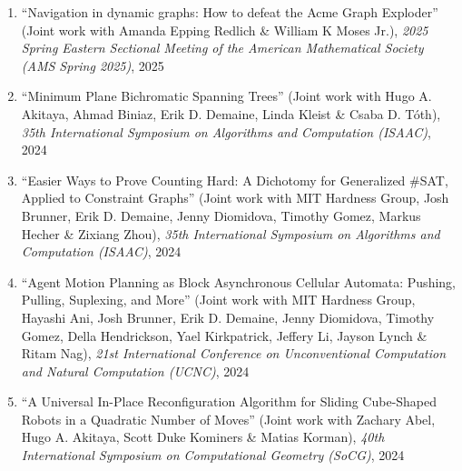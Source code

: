 \documentclass[letterpaper,11pt]{article}
\makeatletter
\newcommand{\publication}[6]{
  \item ``#1'' %
   (Joint work with#2), %
     \emph{#3}, %
      #4%


}
\newcommand{\pdficon}{\faFilePdf}
\newcommand{\doilabel}{\texttt{DOI}}
\makeatother
\begin{document}
\begin{enumerate}
        \publication
          {Navigation in dynamic graphs: How to defeat the Acme Graph Exploder}
          {
 Amanda Epping Redlich \& William K Moses Jr.}
          {2025 Spring Eastern Sectional Meeting of the American Mathematical Society (AMS Spring 2025)}
          {2025}
          {%
%
%
%
          }
          {6}
 \vspace{-.5em}  
      
        \publication
          {Minimum Plane Bichromatic Spanning Trees}
          {
 Hugo A. Akitaya, Ahmad Biniaz, Erik D. Demaine, Linda Kleist \& Csaba D. Tóth}
          {35th International Symposium on Algorithms and Computation (ISAAC)}
          {2024}
          {%
\href{tba/docstore/MPBST-ISAAC.pdf}{\pdficon}%
%
\quad\href{https://doi.org/10.4230/LIPIcs.ISAAC.2024.4}{\doilabel}%
          }
          {7}
 \vspace{-.5em}  
      
        \publication
          {Easier Ways to Prove Counting Hard: A Dichotomy for Generalized \#SAT, Applied to Constraint Graphs}
          {
 MIT Hardness Group, Josh Brunner, Erik D. Demaine, Jenny Diomidova, Timothy Gomez, Markus Hecher \& Zixiang Zhou}
          {35th International Symposium on Algorithms and Computation (ISAAC)}
          {2024}
          {%
\href{tba/docstore/Easier-Ways-Hard-Counting-ISAAC.pdf}{\pdficon}%
%
\quad\href{https://doi.org/10.4230/LIPIcs.ISAAC.2024.51}{\doilabel}%
          }
          {8}
 \vspace{-.5em}  
      
        \publication
          {Agent Motion Planning as Block Asynchronous Cellular Automata: Pushing, Pulling, Suplexing, and More}
          {
 MIT Hardness Group, Hayashi Ani, Josh Brunner, Erik D. Demaine, Jenny Diomidova, Timothy Gomez, Della Hendrickson, Yael Kirkpatrick, Jeffery Li, Jayson Lynch \& Ritam Nag}
          {21st International Conference on Unconventional Computation and Natural Computation (UCNC)}
          {2024}
          {%
\href{tba/docstore/Block-Pushing-UCNC.pdf}{\pdficon}%
%
\quad\href{https://doi.org/10.1007/978-3-031-63742-1_16}{\doilabel}%
          }
          {9}
 \vspace{-.5em}  
      
        \publication
          {A Universal In-Place Reconfiguration Algorithm for Sliding Cube-Shaped Robots in a Quadratic Number of Moves}
          {
 Zachary Abel, Hugo A. Akitaya, Scott Duke Kominers \& Matias Korman}
          {40th International Symposium on Computational Geometry (SoCG)}
          {2024}
          {%
\href{tba/docstore/Universal-In-Place-Sliding-Cubes-SOCG.pdf}{\pdficon}%
%
\quad\href{https://doi.org/10.4230/LIPIcs.SoCG.2024.1}{\doilabel}%
          }
          {10}
 \vspace{-.5em}  
      

\end{enumerate}
\end{document}
